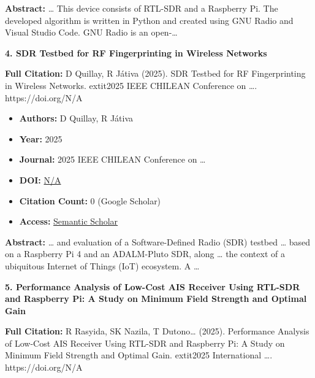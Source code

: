 \documentclass[11pt,a4paper]{article}
\begin{document}
\textbf{Abstract:} … This device consists of RTL-SDR and a Raspberry Pi. The developed algorithm is written in Python and created using GNU Radio and Visual Studio Code. GNU Radio is an open-…\par\vspace{0.5em}



\textbf{4. SDR Testbed for RF Fingerprinting in Wireless Networks}

\textbf{Full Citation:} D Quillay, R Játiva (2025). SDR Testbed for RF Fingerprinting in Wireless Networks. 	extit{2025 IEEE CHILEAN Conference on …}. https://doi.org/N/A

\begin{resultbox}
\begin{itemize}[leftmargin=*]
    \item \textbf{Authors:} D Quillay, R Játiva
    \item \textbf{Year:} 2025
    \item \textbf{Journal:} 2025 IEEE CHILEAN Conference on …
    
    
    
    \item \textbf{DOI:} \href{https://doi.org/}{N/A}
    \item \textbf{Citation Count:} 0 (Google Scholar)
    \item \textbf{Access:} \href{https://ieeexplore.ieee.org/abstract/document/11476019/}{Semantic Scholar}
\end{itemize}
\end{resultbox}

\textbf{Abstract:} … and evaluation of a Software-Defined Radio (SDR) testbed … based on a Raspberry Pi 4 and an ADALM-Pluto SDR, along … the context of a ubiquitous Internet of Things (IoT) ecosystem. A …\par\vspace{0.5em}



\textbf{5. Performance Analysis of Low-Cost AIS Receiver Using RTL-SDR and Raspberry Pi: A Study on Minimum Field Strength and Optimal Gain}

\textbf{Full Citation:} R Rasyida, SK Nazila, T Dutono… (2025). Performance Analysis of Low-Cost AIS Receiver Using RTL-SDR and Raspberry Pi: A Study on Minimum Field Strength and Optimal Gain. 	extit{2025 International …}. https://doi.org/N/A
\end{document}
